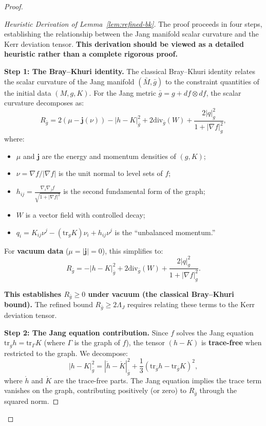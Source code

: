 \documentclass[12pt]{article}
\theoremstyle{plain}
\theoremstyle{definition}
\theoremstyle{remark}
\newcommand{\tr}{\mathrm{tr}}
\newcommand{\Div}{\mathrm{div}}
\newcommand{\bg}{\bar{g}}
\newcommand{\bM}{\bar{M}}
\newcommand{\momdens}{\boldsymbol{j}}
\begin{document}
\begin{proof}
\begin{proof}[Heuristic Derivation of Lemma~\ref{lem:refined-bk}]
The proof proceeds in four steps, establishing the relationship between the Jang manifold scalar curvature and the Kerr deviation tensor. \textbf{This derivation should be viewed as a detailed heuristic rather than a complete rigorous proof.}

\textbf{Step 1: The Bray--Khuri identity.}
The classical Bray--Khuri identity \cite[Theorem 2.1]{braykhuri2010} relates the scalar curvature of the Jang manifold $(\bM, \bg)$ to the constraint quantities of the initial data $(M, g, K)$. For the Jang metric $\bg = g + df \otimes df$, the scalar curvature decomposes as:
\begin{equation}\label{eq:bk-identity}
R_{\bg} = 2(\mu - \momdens(\nu)) - |h - K|^2_{\bg} + 2\Div_{\bg}(W) + \frac{2|q|^2_g}{1 + |\nabla f|^2_g},
\end{equation}
where:
\begin{itemize}
    \item $\mu$ and $\momdens$ are the energy and momentum densities of $(g, K)$;
    \item $\nu = \nabla f / |\nabla f|$ is the unit normal to level sets of $f$;
    \item $h_{ij} = \frac{\nabla_i \nabla_j f}{\sqrt{1 + |\nabla f|^2}}$ is the second fundamental form of the graph;
    \item $W$ is a vector field with controlled decay;
    \item $q_i = K_{ij}\nu^j - (\tr_g K)\nu_i + h_{ij}\nu^j$ is the ``unbalanced momentum.''
\end{itemize}

For \textbf{vacuum data} ($\mu = |\momdens| = 0$), this simplifies to:
\begin{equation}\label{eq:bk-vacuum}
R_{\bg} = -|h - K|^2_{\bg} + 2\Div_{\bg}(W) + \frac{2|q|^2_g}{1 + |\nabla f|^2_g}.
\end{equation}

\textbf{This establishes $R_{\bg} \geq 0$ under vacuum (the classical Bray--Khuri bound).} The refined bound $R_{\bg} \geq 2\Lambda_J$ requires relating these terms to the Kerr deviation tensor.

\textbf{Step 2: The Jang equation contribution.}
Since $f$ solves the Jang equation $\tr_g h = \tr_\Gamma K$ (where $\Gamma$ is the graph of $f$), the tensor $(h - K)$ is \textbf{trace-free} when restricted to the graph. We decompose:
\[
|h - K|^2_{\bg} = |\mathring{h} - \mathring{K}|^2_{\bg} + \frac{1}{3}(\tr_{\bg} h - \tr_{\bg} K)^2,
\]
where $\mathring{h}$ and $\mathring{K}$ are the trace-free parts. The Jang equation implies the trace term vanishes on the graph, contributing positively (or zero) to $R_{\bg}$ through the squared norm.


\end{proof}
\end{proof}
\end{document}
